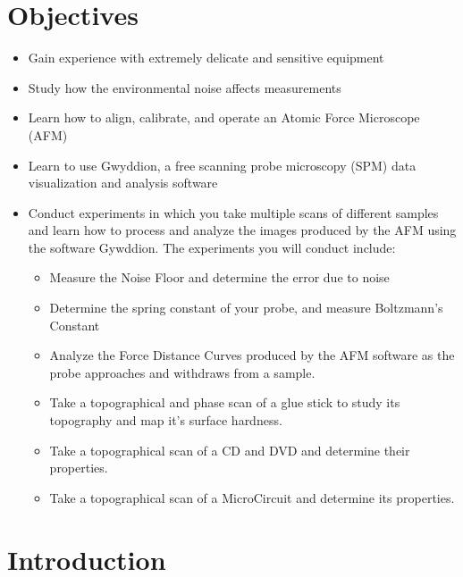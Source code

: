 \documentclass{../lab}
\begin{document}
\section{Objectives}

\begin{itemize}
    \item Gain experience with extremely delicate and sensitive equipment

    \item Study how the environmental noise affects measurements

    \item Learn how to align, calibrate, and operate an Atomic Force Microscope (AFM)

    \item Learn to use Gwyddion, a free scanning probe microscopy (SPM) data visualization and analysis software

    \item Conduct experiments in which you take multiple scans of different samples and learn how to process and analyze the images produced by the AFM using the software Gywddion.  The experiments you will conduct include:

    \begin{itemize}
        \item Measure the Noise Floor and determine the error due to noise

        \item Determine the spring constant of your probe, and measure Boltzmann's Constant

        \item Analyze the Force Distance Curves produced by the AFM software as the probe approaches and withdraws from a sample.

        \item Take a topographical and phase scan of a glue stick to study its topography and map it's surface hardness.

        \item Take a topographical scan of a CD and DVD and determine their properties.

        \item Take a topographical scan of a MicroCircuit and determine its properties.

    \end{itemize}

\end{itemize}

\section{Introduction}
\end{document}
